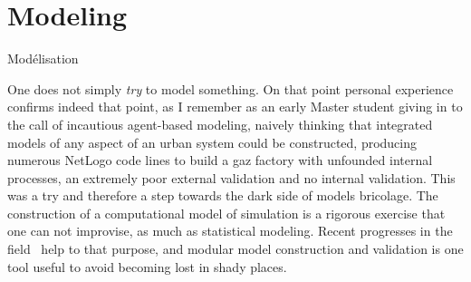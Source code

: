 


\section{Modeling}{Modélisation} %

\label{ch:modeling} %








\bigskip


One does not simply \emph{try} to model something. On that point personal experience confirms indeed that point, as I remember as an early Master student giving in to the call of incautious agent-based modeling, 
 naively thinking that integrated models of any aspect of an urban system could be constructed, producing numerous NetLogo code lines to build a gaz factory with unfounded internal processes, an extremely poor external validation and no internal validation. This was a try and therefore a step towards the dark side of models bricolage. The construction of a computational model of simulation is a rigorous exercise that one can not improvise, as much as statistical modeling. Recent progresses in the field~\cite{banos2013pour} help to that purpose, and modular model construction and validation is one tool useful to avoid becoming lost in shady places.

